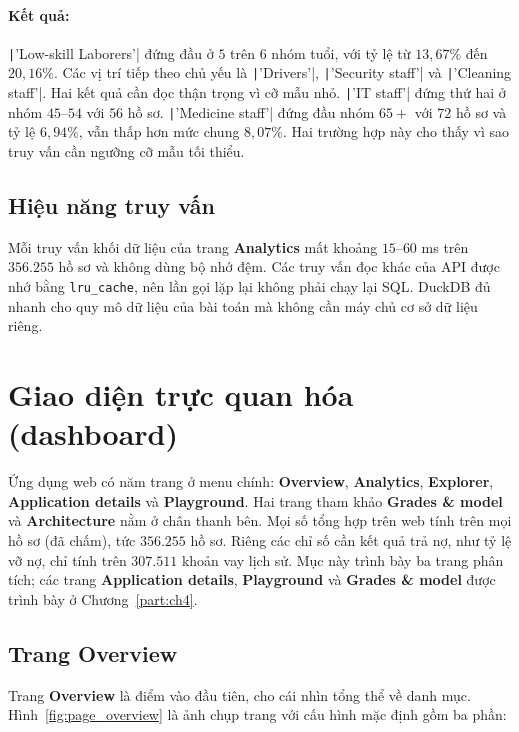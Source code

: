 \paragraph{Kết quả:} \texttt|'Low-skill Laborers'| đứng đầu ở $5$ trên $6$ nhóm tuổi, với tỷ lệ từ $13{,}67\%$ đến $20{,}16\%$. Các vị trí tiếp theo chủ yếu là \texttt|'Drivers'|, \texttt|'Security staff'| và \texttt|'Cleaning staff'|. Hai kết quả cần đọc thận trọng vì cỡ mẫu nhỏ. \texttt|'IT staff'| đứng thứ hai ở nhóm $45$--$54$ với $56$ hồ sơ. \texttt|'Medicine staff'| đứng đầu nhóm $65+$ với $72$ hồ sơ và tỷ lệ $6{,}94\%$, vẫn thấp hơn mức chung $8{,}07\%$. Hai trường hợp này cho thấy vì sao truy vấn cần ngưỡng cỡ mẫu tối thiểu.

\subsection{Hiệu năng truy vấn}
Mỗi truy vấn khối dữ liệu của trang \textbf{Analytics} mất khoảng $15$--$60$ ms trên $356.255$ hồ sơ và không dùng bộ nhớ đệm. Các truy vấn đọc khác của API được nhớ bằng \texttt{lru\_cache}, nên lần gọi lặp lại không phải chạy lại SQL. DuckDB đủ nhanh cho quy mô dữ liệu của bài toán mà không cần máy chủ cơ sở dữ liệu riêng.

\section{Giao diện trực quan hóa (dashboard)}
\label{sec:dashboard}
Ứng dụng web có năm trang ở menu chính: \textbf{Overview}, \textbf{Analytics}, \textbf{Explorer}, \textbf{Application details} và \textbf{Playground}. Hai trang tham khảo \textbf{Grades \& model} và \textbf{Architecture} nằm ở chân thanh bên. Mọi số tổng hợp trên web tính trên mọi hồ sơ (đã chấm), tức $356.255$ hồ sơ. Riêng các chỉ số cần kết quả trả nợ, như tỷ lệ vỡ nợ, chỉ tính trên $307.511$ khoản vay lịch sử. Mục này trình bày ba trang phân tích; các trang \textbf{Application details}, \textbf{Playground} và \textbf{Grades \& model} được trình bày ở Chương~\ref{part:ch4}.

\subsection{Trang Overview}
Trang \textbf{Overview} là điểm vào đầu tiên, cho cái nhìn tổng thể về danh mục. Hình~\ref{fig:page_overview} là ảnh chụp trang với cấu hình mặc định gồm ba phần:

